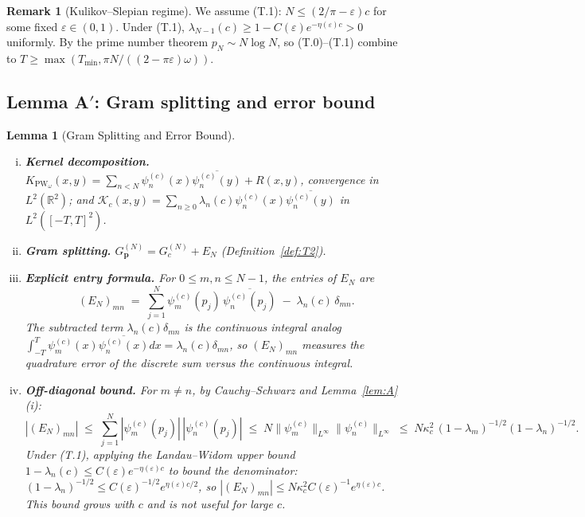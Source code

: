 \documentclass[12pt,a4paper]{amsart}
\newtheorem{lemma}[theorem]{Lemma}
\theoremstyle{definition}
\newtheorem{remark}[theorem]{Remark}
\newcommand{\PW}{\mathrm{PW}_\omega}
\newcommand{\Kop}{\mathcal{K}_c}
\newcommand{\Kul}{\kappa_c}
\newcommand{\GVM}{G^{(N)}_{\mathbf{p}}}
\newcommand{\Tmin}{T_{\min}}
\newcommand{\EN}{E_N}
\newcommand{\norm}[1]{\|#1\|}
\begin{document}
\begin{remark}[Kulikov--Slepian regime]\label{rem:Kulikov_regime}
We assume (T.1): $N\leq(2/\pi-\varepsilon)c$ for some fixed
$\varepsilon\in(0,1)$. Under (T.1), $\lambda_{N-1}(c)\geq
1-C(\varepsilon)e^{-\eta(\varepsilon)c}>0$ uniformly.
By the prime number theorem $p_N\sim N\log N$, so (T.0)--(T.1) combine to
$T\geq\max(\Tmin,\pi N/((2-\pi\varepsilon)\omega))$.
\end{remark}

\subsection{Lemma A$'$: Gram splitting and error bound}

\begin{lemma}[Gram Splitting and Error Bound]\label{lem:Aprime}
\begin{enumerate}[(i)]
\item \textbf{Kernel decomposition.}
$K_{\PW}(x,y)=\sum_{n<N}\psi_n^{(c)}(x)\overline{\psi_n^{(c)}(y)}+R(x,y)$,
convergence in $L^2(\mathbb{R}^2)$; and
$\Kop(x,y)=\sum_{n\geq0}\lambda_n(c)\psi_n^{(c)}(x)
\overline{\psi_n^{(c)}(y)}$ in $L^2([-T,T]^2)$.

\item \textbf{Gram splitting.}
$\GVM=G_c^{(N)}+\EN$ (Definition~\ref{def:T2}).

\item \textbf{Explicit entry formula.}
For $0\leq m,n\leq N-1$, the entries of $\EN$ are
\[
  (\EN)_{mn}
  \;=\;
  \sum_{j=1}^N\psi_m^{(c)}(p_j)\,\overline{\psi_n^{(c)}(p_j)}
  \;-\;\lambda_n(c)\,\delta_{mn}.
\]
The subtracted term $\lambda_n(c)\delta_{mn}$ is the
\emph{continuous integral analog}
$\int_{-T}^T\psi_m^{(c)}(x)\overline{\psi_n^{(c)}(x)}dx
=\lambda_n(c)\delta_{mn}$, so $(\EN)_{mn}$ measures
the \emph{quadrature error} of the discrete sum versus the
continuous integral.

\item \textbf{Off-diagonal bound.}
For $m\neq n$, by Cauchy--Schwarz and Lemma~\ref{lem:A}(i):
\[
  |(\EN)_{mn}|
  \;\leq\;
  \sum_{j=1}^N|\psi_m^{(c)}(p_j)|\,|\psi_n^{(c)}(p_j)|
  \;\leq\;
  N\norm{\psi_m^{(c)}}_{L^\infty}\norm{\psi_n^{(c)}}_{L^\infty}
  \;\leq\;
  N\Kul^2\,(1-\lambda_m)^{-1/2}(1-\lambda_n)^{-1/2}.
\]
Under (T.1), applying the Landau--Widom upper bound
$1-\lambda_n(c)\leq C(\varepsilon)e^{-\eta(\varepsilon)c}$
to bound the \emph{denominator}:
$(1-\lambda_n)^{-1/2}\leq C(\varepsilon)^{-1/2}e^{\eta(\varepsilon)c/2}$,
so $|(\EN)_{mn}|\leq N\Kul^2 C(\varepsilon)^{-1}e^{\eta(\varepsilon)c}$.
This bound grows with $c$ and is not useful for large $c$.


\end{enumerate}
\end{lemma}
\end{document}
